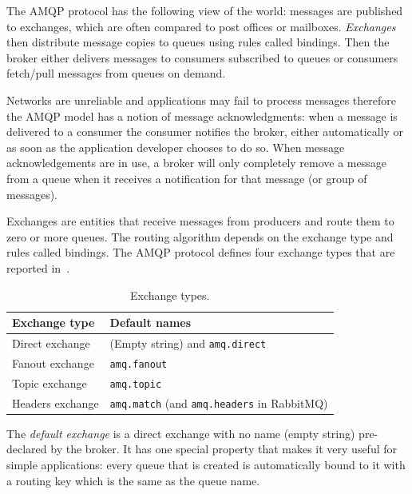 The AMQP protocol has the following view of the world: messages are published to exchanges, which are often compared to post offices or mailboxes.
\emph{Exchanges} then distribute message copies to queues using rules called bindings. Then the broker either delivers messages to consumers
subscribed to queues or consumers fetch/pull messages from queues on demand.

Networks are unreliable and applications may fail to process messages therefore the AMQP model has a notion of message acknowledgments: when a
message is delivered to a consumer the consumer notifies the broker, either automatically or as soon as the application developer chooses to do so.
When message acknowledgements are in use, a broker will only completely remove a message from a queue when it receives a notification for that
message (or group of messages).

Exchanges are entities that receive messages from producers and route them to zero or more queues. The routing algorithm depends on the exchange
type and rules called bindings. The AMQP protocol defines four exchange types that are reported in~.

\begin{table}
	\centering
	\begin{tabular}{l l}
		\toprule
		\textbf{Exchange type} & \textbf{Default names}                                    \\
		\midrule
		Direct exchange        & (Empty string) and \texttt{amq.direct}                    \\
		Fanout exchange        & \texttt{amq.fanout}                                       \\
		Topic exchange         & \texttt{amq.topic}                                        \\
		Headers exchange       & \texttt{amq.match} (and \texttt{amq.headers} in RabbitMQ) \\
		\bottomrule
	\end{tabular}
	\caption{Exchange types.}
	\label{tab:exchange-types}
\end{table}

The \emph{default exchange} is a direct exchange with no name (empty string) pre-declared by the broker. It has one special property that makes it
very useful for simple applications: every queue that is created is automatically bound to it with a routing key which is the same as the queue name.

